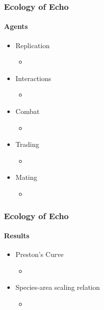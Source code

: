\frame
{
	\frametitle{Ecology of Echo}
	\framesubtitle{Agents}

	\begin{itemize}
		\item Replication
		\begin{itemize}
			\item
		\end{itemize}
		\item Interactions
		\begin{itemize}
			\item
		\end{itemize}
		\item Combat
		\begin{itemize}
			\item
		\end{itemize}
		\item Trading
		\begin{itemize}
			\item
		\end{itemize}
		\item Mating
		\begin{itemize}
			\item
		\end{itemize}
	\end{itemize}
}

\frame
{
	\frametitle{Ecology of Echo}
	\framesubtitle{Results}

	\begin{itemize}
		\item Preston's Curve
		\begin{itemize}
			\item
		\end{itemize}
		\item Species-area scaling relation
		\begin{itemize}
			\item
		\end{itemize}
	\end{itemize}
}